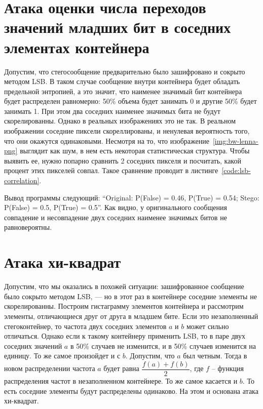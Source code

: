 \section{Атака оценки числа переходов значений младших бит в соседних элементах контейнера}
Допустим, что стегосообщение предварительно было зашифровано и сокрыто методом LSB.
В таком случае сообщение внутри контейнера будет обладать предельной энтропией,
а это значит, что наименее значимый бит контейнера будет распределен равномерно:
50\% объема будет занимать 0 и другие 50\% будет занимать 1. При этом два соседних
наименее значимых бита не будут скорелированны. Однако в реальных изображениях это не так.
В реальном изображении соседние пиксели скореллированы, и ненулевая вероятность того,
что они окажутся одинаковыми. Несмотря на то, что изображение~\ref{img:bw-lenna-png}
выглядит как шум, в нем есть некоторая статистическая структура. Чтобы выявить ее,
нужно попарно сравнить 2 соседних пикселя и посчитать, какой процент этих пикселей совпал.
Такое сравнение проводит в листинге~\ref{code:lsb-correlation}.

Вывод программы следующий: ``Original: P(False) = 0.46, P(True) = 0.54; Stego: P(False) = 0.5, P(True) = 0.5''.
Как видно, у оригинального сообщения совпадение и несовпадение двух соседних наименее значимых битов не равновероятны. 

\section{Атака хи-квадрат}
Допустим, что мы оказались в похожей ситуации: зашифрованное сообщение
было сокрыто методом LSB, --- но в этот раз в контейнере соседние элементы не скорелированны.
Построим гистаграмму элементов контейнера и рассмотрим элементы, отличающиеся друг от друга в младшем бите.
Если это незаполненный стегоконтейнер, то частота двух соседних элементов $a$ и $b$ может сильно отличаться.
Однако если к такому контейнеру применить LSB, то в паре двух соседних значений $a$ в 50\%
случаев не изменится, и в 50\% случаев изменится на единицу. То же самое произойдет и с $b$.
Допустим, что $a$ был четным. Тогда в новом распределении частота $a$ будет равна $\dfrac{ f(a) + f(b)}{2}$,
где $f$ -- функция распределения частот в незаполненном контейнере. То же самое касается и $b$.
То есть соседние элементы будут распределены одинаково. На этом и основана атака хи-квадрат.

